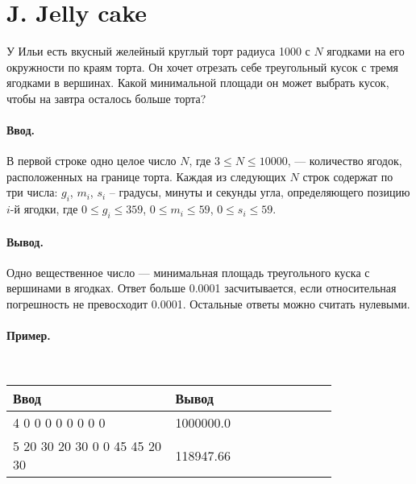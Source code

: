 \documentclass[12pt, a5paper]{article}
\newcommand{\informat}[1]
{
	\paragraph{Ввод.\\} #1
}
\newcommand{\outformat}[1]
{
	\paragraph{Вывод.\\} #1
}
\newcommand{\examplee}[4]
{
	\paragraph{Пример.\\}
	{\tt
	\begin{tabular}{|p{0.4\linewidth}|p{0.4\linewidth}|}
	\hline
	Ввод 	& Вывод  	\\
	\hline
	#1 		& #2 		\\
	\hline
	#3		& #4		\\
	\hline
	\end{tabular}
	}
}
\begin{document}
\section*{J. Jelly cake}

У Ильи есть вкусный желейный круглый торт радиуса 1000 с $N$ ягодками на его окружности по краям торта. Он хочет отрезать себе треугольный кусок с тремя ягодками в вершинах. Какой минимальной площади он может выбрать кусок, чтобы на завтра осталось больше торта?

\informat{В первой строке одно целое число $N$, где $3 \le N \le 10000$, --- количество ягодок, расположенных на границе торта. \newline Каждая из следующих $N$ строк содержат по три числа: $g_i$, $m_i$, $s_i$ -- градусы, минуты и секунды угла, определяющего позицию $i$-й ягодки, где $0 \le g_i \le 359$, $0 \le m_i \le 59$, $0 \le s_i \le 59$.}

\outformat{Одно вещественное число --- минимальная площадь треугольного куска с вершинами в ягодках. Ответ больше 0.0001 засчитывается, если относительная погрешность не превосходит 0.0001. Остальные ответы можно считать нулевыми.}

\examplee{4 \newline
0 0 0\newline
90 0 0\newline
180 0 0\newline
270 0 0}{1000000.0}
{5 \newline
180 20 30\newline
120 20 30\newline
0 0 0\newline
45 45 45\newline
90 20 30}{118947.66}
\end{document}
